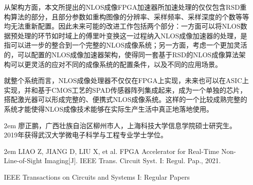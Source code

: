 \documentclass[master]{shtthesis}             %
\makeatletter
\def\ifgraduate{\ifsht@graduate}
\makeatother
\begin{document}
从架构方面，本文所提出的NLOS成像FPGA加速器所加速处理的仅仅包含RSD重构算法的部分，且部分参数如重构图像的分辨率、采样频率、采样深度的个数等等均无法重新配置。因此未来可能的改进工作包括两个部分：一方面可以将NLOS数据预处理的环节如时域上的傅里叶变换这一过程纳入NLOS成像加速器的处理，是指可以进一步的整合到一个完整的NLOS成像系统；另一方面，考虑一个更加灵活的，可以配置的NLOS成像加速器架构，使得同一套基于RSD的NLOS成像算法架构可以更灵活的应对不同的成像系统的配置条件，以及不同的应用场景。

就整个系统而言，NLOS成像处理器不仅仅在FPGA上实现，未来也可以在ASIC上实现，并和基于CMOS工艺的SPAD传感器阵列集成起来，成为一个单独的芯片，搭配激光器可以形成完整的、便携式NLOS成像系统。这样的一个比较成熟完整的系统才能使得NLOS成像技术能够在实际生产生活中真正地落地使用。

\makebiblio


\backmatter
\begin{acknowledgement}
\end{acknowledgement}

\ifgraduate
\begin{resume}
  \hangindent 2em
  廖正鹏，广西壮族自治区柳州市人，上海科技大学信息学院硕士研究生。2019年获得武汉大学微电子科学与工程专业学士学位。
\end{resume}

\begin{publications}
  \hangindent 2em
  \noindent
  LIAO Z, JIANG D, LIU X, et al. FPGA Accelerator for Real-Time Non-Line-of-Sight Imaging[J]. IEEE Trans. Circuit Syst. I: Regul. Pap., 2021.

\end{publications}

\begin{publications*}
  IEEE Transactions on Circuits and Systems I: Regular Papers
\end{publications*}



\fi
\end{document}
